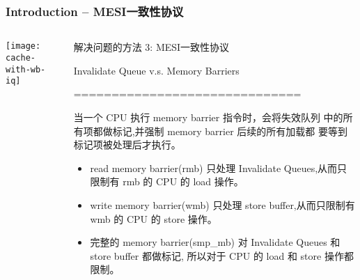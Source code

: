 \begin{frame}[plain]	
    \frametitle{Introduction -- MESI一致性协议}
    
    
    \begin{columns}
        
        \begin{column}{.4\textwidth}
            \texttt{[image: cache-with-wb-iq]}
        \end{column}
        \begin{column}{.6\textwidth}
            解决问题的方法 3: MESI一致性协议
            
            Invalidate  Queue v.s. Memory  Barriers
            
            ==============================
            
            当一个 CPU 执行 memory barrier 指令时，会将失效队列
            中的所有项都做标记,并强制 memory barrier 后续的所有加载都
            要等到标记项被处理后才执行。
            \begin{itemize}
                \item read memory barrier(rmb) 只处理 Invalidate Queues,从而只限制有 rmb 的 CPU
                的 load 操作。
                \item write memory barrier(wmb) 只处理 store buffer,从而只限制有 wmb 的 CPU 的
                store 操作。
                \item 完整的 memory barrier(smp\_mb) 对 Invalidate Queues 和 store buffer 都做标记,
                所以对于 CPU 的 load 和 store 操作都限制。

                
            \end{itemize}
            
        \end{column}
    \end{columns}
    
\end{frame}


